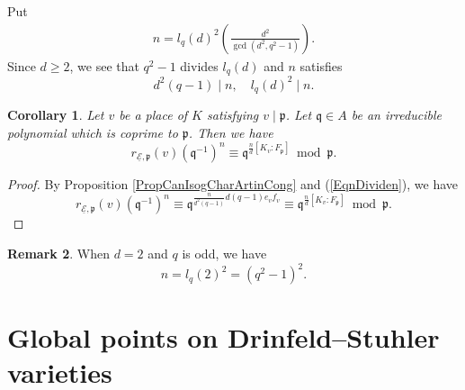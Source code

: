 \documentclass[10pt]{amsart}
\theoremstyle{plain}
\newtheorem{thm}{Theorem}[section]
\newtheorem{cor}[thm]{Corollary}
\theoremstyle{definition}
\newtheorem{rmk}[thm]{Remark}
\newcommand{\opp}{\mathrm{op}}
\newcommand{\ucE}{\underline{\mathcal{E}}}
\newcommand{\sD}{\mathscr{D}}
\newcommand{\frp}{\mathfrak{p}}
\newcommand{\frq}{\mathfrak{q}}
\begin{document}
Put
\begin{equation}\label{EqnDefn}
	\begin{gathered}
		n=l_q(d)^2\left(\frac{d^2}{\gcd(d^2,q^2-1)}\right).
\end{gathered}
\end{equation}
Since $d\geq 2$, we see that $q^2-1$ divides $l_q(d)$ and $n$ satisfies
\begin{equation}\label{EqnDividen}
d^2(q-1)\mid n,\quad l_q(d)^2\mid n.
\end{equation}

\begin{cor}\label{CorCanIsogChar-n}
	Let $v$ be a place of $K$ satisfying $v\mid \frp$. 
	Let $\frq\in A$ be an irreducible polynomial which is coprime to $\frp$. Then we have
	\[
	r_{\ucE,\frp}(v)(\frq^{-1})^n\equiv \frq^{\frac{n}{d}[K_v:F_\frp]} \bmod \frp.
	\]
\end{cor}
\begin{proof}
	By Proposition \ref{PropCanIsogCharArtinCong} and (\ref{EqnDividen}), we have
	\[
	r_{\ucE,\frp}(v)(\frq^{-1})^n\equiv \frq^{\frac{n}{d^2(q-1)}d (q-1)e_v f_v} \equiv \frq^{\frac{n}{d}[K_v:F_\frp]} \bmod \frp.
	\]
\end{proof}

\begin{rmk}\label{RmkCanIsogChar-n-d2}
	When $d=2$ and $q$ is odd, we have 
	\[
	n=l_q(2)^2=(q^2-1)^2.
	\]
\end{rmk}




\section{Global points on Drinfeld--Stuhler varieties}\label{SecGlobalPoints}

\end{document}
